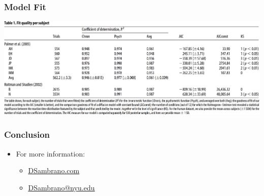 \documentclass[xcolor=dvipsnames]{beamer} %
\begin{document}
\begin{frame} %
	\frametitle{Model Fit}
    \includegraphics[width=\textwidth]{ModelFit.png}
\end{frame}














\begin{frame} %
	\frametitle{Conclusion}
\end{frame}






\begin{frame} %
\begin{figure}
	\centering
\end{figure}
\begin{itemize}
	\item For more information:
		\begin{itemize}
			\item \href{dsambrano.com}{\color{blue}\underline{DSambrano.com}}
			\item \href{mailto:dsambranonyu.edu}{\color{blue}\underline{DSambrano@nyu.edu}}
		\end{itemize}
\end{itemize}
\end{frame}
\end{document}

